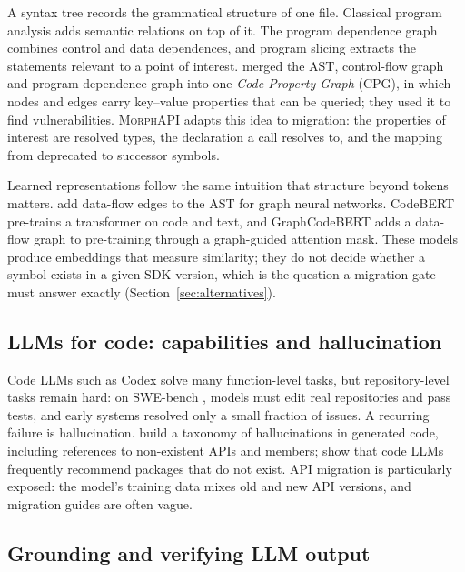 \documentclass[11pt,a4paper]{article}
\newcommand{\morph}{\textsc{MorphAPI}}
\begin{document}
A syntax tree records the grammatical structure of one file. Classical program analysis
adds semantic relations on top of it. The program dependence graph \citep{ferrante1987pdg}
combines control and data dependences, and program slicing \citep{weiser1981slicing}
extracts the statements relevant to a point of interest. \citet{yamaguchi2014cpg} merged
the AST, control-flow graph and program dependence graph into one \emph{Code Property
Graph} (CPG), in which nodes and edges carry key--value properties that can be queried;
they used it to find vulnerabilities. \morph{} adapts this idea to migration: the properties
of interest are resolved types, the declaration a call resolves to, and the mapping from
deprecated to successor symbols.

Learned representations follow the same intuition that structure beyond tokens matters.
\citet{allamanis2018graphs} add data-flow edges to the AST for graph neural networks.
CodeBERT \citep{feng2020codebert} pre-trains a transformer on code and text, and
GraphCodeBERT \citep{guo2021graphcodebert} adds a data-flow graph to pre-training through a
graph-guided attention mask. These models produce embeddings that measure similarity; they
do not decide whether a symbol exists in a given SDK version, which is the question a
migration gate must answer exactly (Section~\ref{sec:alternatives}).

\subsection{LLMs for code: capabilities and hallucination}

Code LLMs such as Codex \citep{chen2021codex} solve many function-level tasks, but
repository-level tasks remain hard: on SWE-bench \citep{jimenez2024swebench}, models must
edit real repositories and pass tests, and early systems resolved only a small fraction of
issues. A recurring failure is hallucination. \citet{liu2024hallucination} build a taxonomy of
hallucinations in generated code, including references to non-existent APIs and members;
\citet{spracklen2025package} show that code LLMs frequently recommend packages that do not
exist. API migration is particularly exposed: the model's training data mixes old and new
API versions, and migration guides are often vague.

\subsection{Grounding and verifying LLM output}
\end{document}
